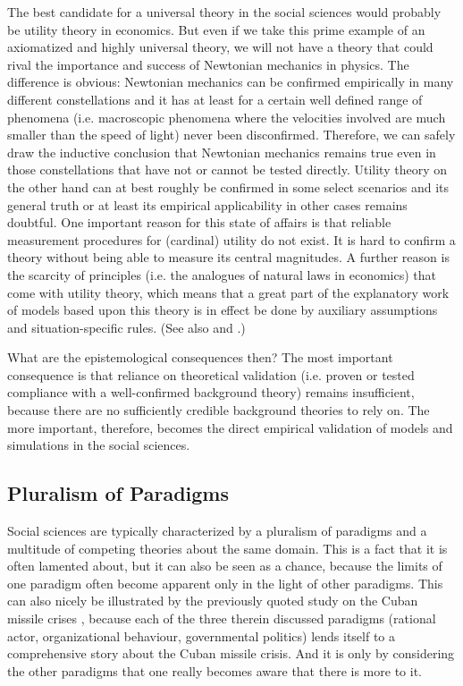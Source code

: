 \documentclass[onecollarge]{STJour}
\numberwithin{equation}{section}
\begin{document}
The best candidate for a universal theory in the social sciences would
probably be utility theory in economics. But even if we take this prime
example of an axiomatized and highly universal theory, we will not have a
theory that could rival the importance and success of Newtonian mechanics
in physics. The difference is obvious: Newtonian mechanics can be
confirmed empirically in many different constellations and it has at
least for a certain well defined range of phenomena (i.e. macroscopic
phenomena where the velocities involved are much smaller than the speed
of light) never been disconfirmed. Therefore, we can safely draw the
inductive conclusion that Newtonian mechanics remains true even in those
constellations that have not or cannot be tested directly. Utility theory
on the other hand can at best roughly be confirmed in some select
scenarios and its general truth or at least its empirical applicability
in other cases remains doubtful. One important reason for this state of
affairs is that reliable measurement procedures for (cardinal) utility do
not exist. It is hard to confirm a theory without being able to measure
its central magnitudes. A further reason is the scarcity of principles
(i.e. the analogues of natural laws in economics) that come with utility
theory, which means that a great part of the explanatory work of models
based upon this theory is in effect be done by auxiliary assumptions and
situation-specific rules. (See also \citet[p.\ 48/49]{cartwright:2009}
and \citet{cartwright:1999}.)

What are the epistemological consequences then? The most important
consequence is that reliance on theoretical validation (i.e. proven or tested
compliance with a well-confirmed background theory) remains insufficient,
because there are no sufficiently credible background theories to rely
on. The more important, therefore, becomes the direct empirical
validation of models and simulations in the social sciences.


\subsection{Pluralism of Paradigms} 

Social sciences are typically
characterized by a pluralism of paradigms and a multitude of competing
theories about the same domain. This is a fact that it is often lamented
about, but it can also be seen as a chance, because the limits of one
paradigm often become apparent only in the light of other paradigms.
This can also nicely be illustrated by the previously quoted study on the
Cuban missile crises \citep[]{allison-zelikow:1999}, because each of the
three therein discussed paradigms (rational actor, organizational
behaviour, governmental politics) lends itself to a comprehensive story
about the Cuban missile crisis. And it is only by considering the
other paradigms that one really becomes aware that there is more to it.
\end{document}
